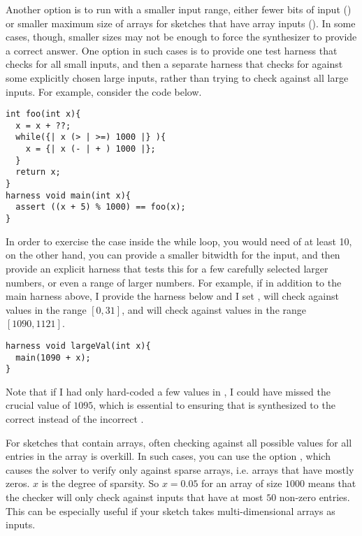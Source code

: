 Another option is to run with a smaller input range,
either fewer bits
of input () or smaller maximum size of arrays
for sketches that have array inputs (). In some cases,
though, smaller sizes may not be enough to force the synthesizer to provide
a correct answer. One option in such cases is to provide one test harness
that checks for all small inputs, and then a separate harness that checks for
against some explicitly chosen large inputs, rather than trying to check against
all large inputs. For example, consider the code below.

\begin{lstlisting}
int foo(int x){
  x = x + ??;
  while({| x (> | >=) 1000 |} ){
    x = {| x (- | + ) 1000 |};
  }
  return x;
}
harness void main(int x){
  assert ((x + 5) % 1000) == foo(x);
}
\end{lstlisting}

In order to exercise the case inside the while loop, you would need
 of at least 10, on the other hand, you can provide a smaller
bitwidth for the input, and then provide an explicit harness that tests this for
a few carefully selected larger numbers, or even a range of larger numbers.
For example, if in addition to the main harness above, I provide the
 harness below and I set ,
 will check against values in the range $[0,31]$, and
 will check against values in the range $[1090,1121]$.
\begin{lstlisting}
harness void largeVal(int x){
  main(1090 + x);
}
\end{lstlisting}
Note that if I had only hard-coded a few values in
, I could have missed the crucial value of $1095$, which is essential
to ensuring that  is synthesized to the correct  instead of
the incorrect .

For sketches that contain arrays, often checking against all possible values
for all entries in the array is overkill. In such cases, you can use the option
, which causes the solver to verify only against
sparse arrays, i.e. arrays that have mostly zeros. $x$ is the degree
of sparsity. So $x=0.05$ for an array of size $1000$ means that the checker will
only check against inputs that have at most $50$ non-zero entries.
This can be especially useful
if your sketch takes multi-dimensional arrays as inputs.

